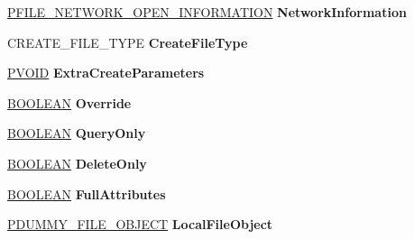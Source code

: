\begin{DoxyCompactItemize}
\mbox{\label{struct___o_p_e_n___p_a_c_k_e_t_a590d57196b6b543a738567576c26c0db}} 
\hyperlink{struct___f_i_l_e___n_e_t_w_o_r_k___o_p_e_n___i_n_f_o_r_m_a_t_i_o_n}{P\+F\+I\+L\+E\+\_\+\+N\+E\+T\+W\+O\+R\+K\+\_\+\+O\+P\+E\+N\+\_\+\+I\+N\+F\+O\+R\+M\+A\+T\+I\+ON} {\bfseries Network\+Information}
\item 
\mbox{\label{struct___o_p_e_n___p_a_c_k_e_t_a8226faef392bd5610e62576238ab1450}} 
C\+R\+E\+A\+T\+E\+\_\+\+F\+I\+L\+E\+\_\+\+T\+Y\+PE {\bfseries Create\+File\+Type}
\item 
\mbox{\label{struct___o_p_e_n___p_a_c_k_e_t_a512ed96839c090cd8afbb036fc326f47}} 
\hyperlink{interfacevoid}{P\+V\+O\+ID} {\bfseries Extra\+Create\+Parameters}
\item 
\mbox{\label{struct___o_p_e_n___p_a_c_k_e_t_a22650e0db979817e3cf562ead8a57c45}} 
\hyperlink{_processor_bind_8h_a112e3146cb38b6ee95e64d85842e380a}{B\+O\+O\+L\+E\+AN} {\bfseries Override}
\item 
\mbox{\label{struct___o_p_e_n___p_a_c_k_e_t_aeda873f4a93640f9d2e7ff9ce715297e}} 
\hyperlink{_processor_bind_8h_a112e3146cb38b6ee95e64d85842e380a}{B\+O\+O\+L\+E\+AN} {\bfseries Query\+Only}
\item 
\mbox{\label{struct___o_p_e_n___p_a_c_k_e_t_a27eb3e08cdfd8054c0fa812d2fdcc367}} 
\hyperlink{_processor_bind_8h_a112e3146cb38b6ee95e64d85842e380a}{B\+O\+O\+L\+E\+AN} {\bfseries Delete\+Only}
\item 
\mbox{\label{struct___o_p_e_n___p_a_c_k_e_t_a76cf2ad2e7448b46160e7a46c8375a61}} 
\hyperlink{_processor_bind_8h_a112e3146cb38b6ee95e64d85842e380a}{B\+O\+O\+L\+E\+AN} {\bfseries Full\+Attributes}
\item 
\mbox{\label{struct___o_p_e_n___p_a_c_k_e_t_a8977d24e76e56c0c68f8f87719c6e0b4}} 
\hyperlink{struct___d_u_m_m_y___f_i_l_e___o_b_j_e_c_t}{P\+D\+U\+M\+M\+Y\+\_\+\+F\+I\+L\+E\+\_\+\+O\+B\+J\+E\+CT} {\bfseries Local\+File\+Object}
\item 
\mbox{\label{struct___o_p_e_n___p_a_c_k_e_t_ac203407d55d4cae89d5de2d44a5e5de8}} 

\end{DoxyCompactItemize}
